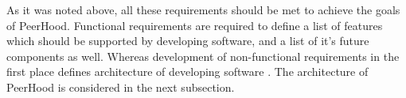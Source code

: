 %
As it was noted above, all these requirements should be met to achieve the goals of PeerHood. 
%
Functional requirements are required to define a list of features which should be supported by  developing software, and a list of it's future components as well. 
%
Whereas development of non-functional requirements in the first place defines  architecture of  developing software . 
%
The architecture of PeerHood is considered in the next subsection. 
